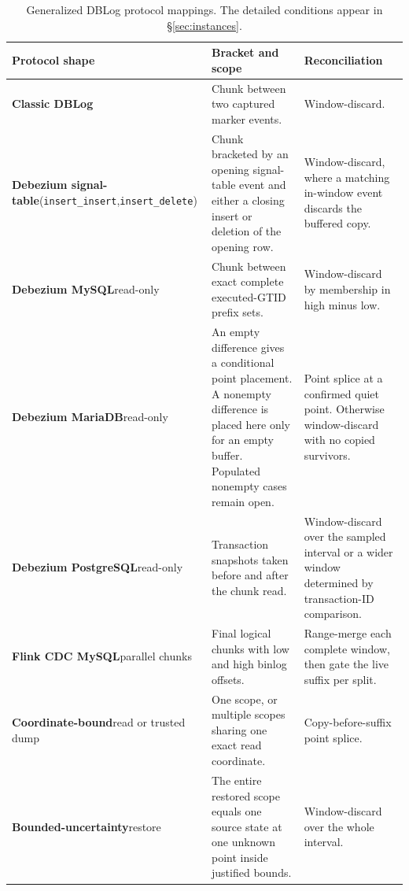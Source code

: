 \documentclass[sigconf,nonacm,10pt]{acmart}
\theoremstyle{plain}
\theoremstyle{definition}
\begin{document}
\begin{table}[t]
\caption{Generalized DBLog protocol mappings. The detailed conditions
appear in \S\ref{sec:instances}.}
\label{tab:instances}
\footnotesize
\setlength{\tabcolsep}{3.5pt}
\renewcommand{\arraystretch}{1.08}
\begin{tabular}{@{}>{\RaggedRight\hyphenpenalty=10000\exhyphenpenalty=10000\arraybackslash}p{3.6cm}
                    >{\RaggedRight\hyphenpenalty=10000\exhyphenpenalty=10000\arraybackslash}p{6.05cm}
                    >{\RaggedRight\hyphenpenalty=10000\exhyphenpenalty=10000\arraybackslash}p{7.1cm}@{}}
\toprule
Protocol shape & Bracket and scope & Reconciliation \\
\midrule
\textbf{Classic DBLog} &
Chunk between two captured marker events. &
Window-discard. \\
\addlinespace
\textbf{Debezium signal-table}\newline(\texttt{insert\_insert},\newline\texttt{insert\_delete}) &
Chunk bracketed by an opening signal-table event and either a closing
insert or deletion of the opening row. &
Window-discard, where a matching in-window event discards the buffered copy. \\
\addlinespace
\textbf{Debezium MySQL}\newline\mbox{read-only} &
Chunk between exact complete executed-GTID prefix sets. &
Window-discard by membership in high minus low. \\
\addlinespace
\textbf{Debezium MariaDB}\newline\mbox{read-only} &
An empty difference gives a conditional point placement. A nonempty difference
is placed here only for an empty buffer. Populated nonempty cases remain open. &
Point splice at a confirmed quiet point. Otherwise window-discard with
no copied survivors. \\
\addlinespace
\textbf{Debezium PostgreSQL}\newline\mbox{read-only} &
Transaction snapshots taken before and after the chunk read. &
Window-discard over the sampled interval or a wider window determined by
transaction-ID comparison. \\
\addlinespace
\textbf{Flink CDC MySQL}\newline parallel chunks &
Final logical chunks with low and high binlog offsets. &
Range-merge each complete window, then gate the live suffix per split. \\
\addlinespace
\textbf{Coordinate-bound}\newline read or trusted dump &
One scope, or multiple scopes sharing one exact read coordinate. &
Copy-before-suffix point splice. \\
\addlinespace
\textbf{Bounded-uncertainty}\newline restore &
The entire restored scope equals one source state at one unknown point
inside justified bounds. &
Window-discard over the whole interval. \\
\bottomrule
\end{tabular}
\end{table}
\end{document}
